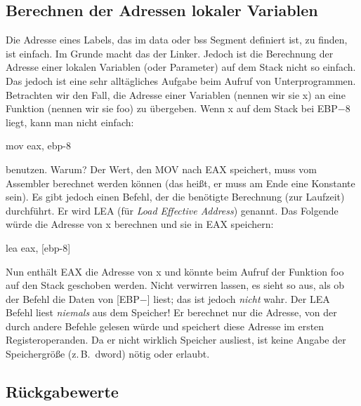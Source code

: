\subsection{Berechnen der Adressen lokaler Variablen}

Die Adresse eines Labels, das im {\code data} oder {\code bss}
Segment definiert ist, zu finden, ist einfach. Im Grunde macht das
der Linker. Jedoch ist die Berechnung der Adresse einer lokalen
Variablen (oder Parameter) auf dem Stack nicht so einfach. Das
jedoch ist eine sehr allt\"{a}gliches Aufgabe beim Aufruf von
Unterprogrammen. Betrachten wir den Fall, die Adresse einer
Variablen (nennen wir sie {\code x}) an eine Funktion (nennen wir
sie {\code foo}) zu \"{u}bergeben. Wenn {\code x} auf dem Stack bei
EBP$-$8 liegt, kann man nicht einfach:
\begin{AsmCodeListing}[numbers=none, frame=none]
      mov    eax, ebp-8
\end{AsmCodeListing}
benutzen. Warum? Der Wert, den {\code MOV} nach EAX speichert, muss
vom Assembler berechnet werden k\"{o}nnen (das hei{\ss}t, er muss am Ende
eine Konstante sein). Es gibt jedoch einen Befehl, der die ben\"{o}tigte
Berechnung (zur Laufzeit) durchf\"{u}hrt. Er wird
 {\code LEA} (f\"{u}r \emph{Load Effective
Address}) genannt. Das Folgende w\"{u}rde die Adresse von {\code x}
berechnen und sie in EAX speichern:
\begin{AsmCodeListing}[numbers=none, frame=none]
      lea    eax, [ebp-8]
\end{AsmCodeListing}
Nun enth\"{a}lt EAX die Adresse von {\code x} und k\"{o}nnte beim Aufruf der
Funktion {\code foo} auf den Stack geschoben werden. Nicht verwirren
lassen, es sieht so aus, als ob der Befehl die Daten von
[EBP\nolinebreak$-$] liest; das ist jedoch \emph{nicht}
wahr. Der {\code LEA} Befehl liest \emph{niemals} aus dem Speicher!
Er berechnet nur die Adresse, von der durch andere Befehle gelesen
w\"{u}rde und speichert diese Adresse im ersten Registeroperanden. Da er
nicht wirklich Speicher ausliest, ist keine Angabe der Speichergr\"{o}{\ss}e
(z.\,B.\ {\code dword}) n\"{o}tig oder erlaubt.

 

\subsection{R\"{u}ckgabewerte}

